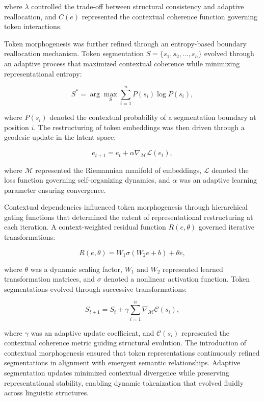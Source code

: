 \documentclass{article}
\begin{document}
where $\lambda$ controlled the trade-off between structural consistency and adaptive reallocation, and $C(e)$ represented the contextual coherence function governing token interactions.

Token morphogenesis was further refined through an entropy-based boundary reallocation mechanism. Token segmentation $S = \{s_1, s_2, \dots, s_n\}$ evolved through an adaptive process that maximized contextual coherence while minimizing representational entropy:

\begin{equation}
	S^* = \arg\max_S \sum_{i=1}^{n} P(s_i) \log P(s_i),
\end{equation}

where $P(s_i)$ denoted the contextual probability of a segmentation boundary at position $i$. The restructuring of token embeddings was then driven through a geodesic update in the latent space:

\begin{equation}
	e_{t+1} = e_t + \alpha \nabla_{\mathcal{M}} \mathcal{L}(e_t),
\end{equation}

where $\mathcal{M}$ represented the Riemannian manifold of embeddings, $\mathcal{L}$ denoted the loss function governing self-organizing dynamics, and $\alpha$ was an adaptive learning parameter ensuring convergence.

Contextual dependencies influenced token morphogenesis through hierarchical gating functions that determined the extent of representational restructuring at each iteration. A context-weighted residual function $R(e, \theta)$ governed iterative transformations:

\begin{equation}
	R(e, \theta) = W_1 \sigma(W_2 e + b) + \theta e,
\end{equation}

where $\theta$ was a dynamic scaling factor, $W_1$ and $W_2$ represented learned transformation matrices, and $\sigma$ denoted a nonlinear activation function. Token segmentations evolved through successive transformations:

\begin{equation}
	S_{t+1} = S_t + \gamma \sum_{i=1}^{n} \nabla_{\mathcal{M}} \mathcal{C}(s_i),
\end{equation}

where $\gamma$ was an adaptive update coefficient, and $\mathcal{C}(s_i)$ represented the contextual coherence metric guiding structural evolution. The introduction of contextual morphogenesis ensured that token representations continuously refined segmentations in alignment with emergent semantic relationships. Adaptive segmentation updates minimized contextual divergence while preserving representational stability, enabling dynamic tokenization that evolved fluidly across linguistic structures.
\end{document}
